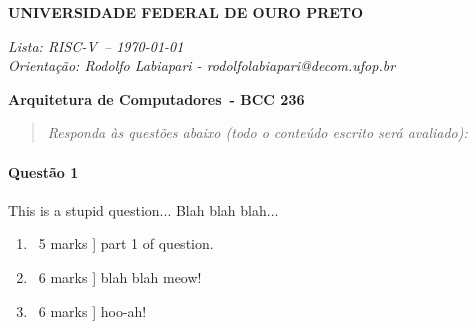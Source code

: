 \documentclass[a4paper,12pt,fleqn]{article}
\newcommand{\institution}{UNIVERSIDADE FEDERAL DE OURO PRETO}
\newcommand{\titlehd}{Arquitetura de Computadores}
\newcommand{\examtype}{Lista: RISC-V}
\newcommand{\examdate}{\today}
\newcommand{\examcode}{BCC 236}
\newcommand{\readtime}{Quinze Minutos}
\newcommand{\writetime}{Duas Horas}
\newcommand{\materials}{Nenhum Material Auxiliar é permitido}
\begin{document}

\begin{center}
\large\textbf{\institution}
\end{center}

\begin{center}
\textit{ \examtype\ -- \examdate \\ Orientação: Rodolfo Labiapari - rodolfolabiapari@decom.ufop.br}
\end{center}

\begin{center}
\large\textbf{\titlehd\ - \examcode}
\end{center}
\vspace{0.3cm}

\begin{comment}

\begin{center}
\textit{Reading Time: \readtime}
\end{center}
\begin{center}
\textit{Writing Time:  \writetime}
\end{center}
\begin{center}
\textit{Permitted Materials: \materials}
\end{center}
\end{comment}

\it

\begin{quote}
	\it
	Responda às questões abaixo (todo o conteúdo escrito será avaliado):
	
\end{quote}

\vspace{0.3cm}

\paragraph{\textbf{Questão 1}}
This is a stupid question... Blah blah blah...
\begin{enumerate}
\item \lbrack \ 5 marks ] part 1 of question.
\item \lbrack \ 6 marks ] blah blah meow!
\item \lbrack \ 6 marks ] hoo-ah!
\end{enumerate}
\end{document}
